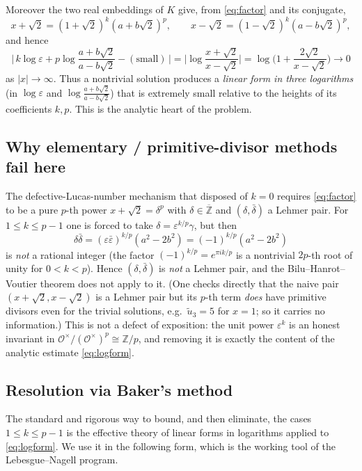 \documentclass{amsart}
\theoremstyle{definition}
\begin{document}
Moreover the two real embeddings of $K$ give, from \eqref{eq:factor} and its
conjugate,
\begin{equation}\label{eq:embeddings}
x+\sqrt2=(1+\sqrt2)^{k}(a+b\sqrt2)^{p},\qquad
x-\sqrt2=(1-\sqrt2)^{k}(a-b\sqrt2)^{p},
\end{equation}
and hence
\begin{equation}\label{eq:logform}
\Big|\,k\log\varepsilon+p\log\frac{a+b\sqrt2}{a-b\sqrt2}-(\text{small})\,\Big|
=\Big|\log\frac{x+\sqrt2}{x-\sqrt2}\Big|
=\log\!\Big(1+\frac{2\sqrt2}{x-\sqrt2}\Big)\longrightarrow0
\end{equation}
as $|x|\to\infty$. Thus a nontrivial solution produces a \emph{linear form in
three logarithms} (in $\log\varepsilon$ and
$\log\frac{a+b\sqrt2}{a-b\sqrt2}$) that is extremely small relative to the
heights of its coefficients $k,p$. This is the analytic heart of the problem.

\subsection*{Why elementary / primitive-divisor methods fail here}
The defective-Lucas-number mechanism that disposed of $k=0$ requires
\eqref{eq:factor} to be a pure $p$-th power $x+\sqrt2=\delta^p$ with
$\delta\in\overline{\mathbb Z}$ and $(\delta,\bar\delta)$ a Lehmer pair. For
$1\le k\le p-1$ one is forced to take $\delta=\varepsilon^{k/p}\gamma$, but
then
\[
\delta\bar\delta=(\varepsilon\bar\varepsilon)^{k/p}(a^2-2b^2)
=(-1)^{k/p}(a^2-2b^2)
\]
is \emph{not} a rational integer (the factor $(-1)^{k/p}=e^{\pi i k/p}$ is a
nontrivial $2p$-th root of unity for $0<k<p$). Hence $(\delta,\bar\delta)$ is
\emph{not} a Lehmer pair, and the Bilu--Hanrot--Voutier theorem does not apply
to it. (One checks directly that the naive pair $(x+\sqrt2,x-\sqrt2)$ is a
Lehmer pair but its $p$-th term \emph{does} have primitive divisors even for
the trivial solutions, e.g.\ $\tilde u_3=5$ for $x=1$; so it carries no
information.) This is not a defect of exposition: the unit power
$\varepsilon^k$ is an honest invariant in $\mathcal O^\times/(\mathcal
O^\times)^p\cong\mathbb Z/p$, and removing it is exactly the content of the
analytic estimate \eqref{eq:logform}.

\subsection*{Resolution via Baker's method}
The standard and rigorous way to bound, and then eliminate, the cases
$1\le k\le p-1$ is the effective theory of linear forms in logarithms applied
to \eqref{eq:logform}. We use it in the following form, which is the working
tool of the Lebesgue--Nagell program.
\end{document}
